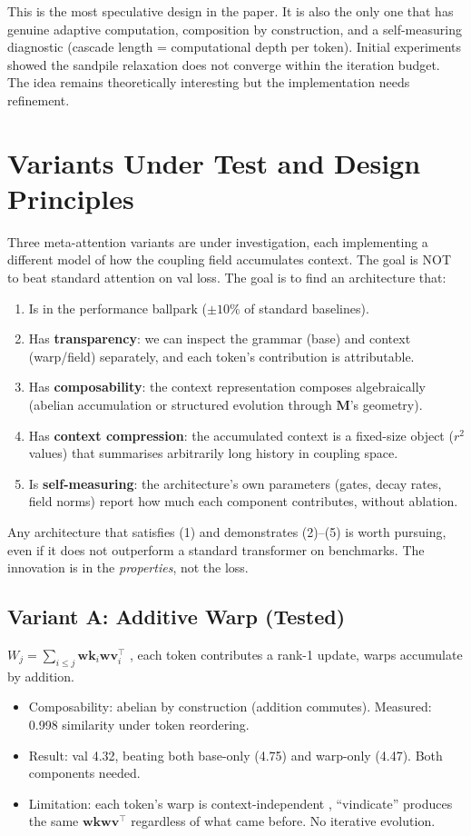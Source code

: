 \documentclass[11pt, a4paper]{article}
\newcommand{\M}{\mathbf{M}}
\theoremstyle{plain}
\theoremstyle{definition}
\theoremstyle{remark}
\begin{document}
This is the most speculative design in the paper.
It is also the only one that has genuine adaptive computation, composition by construction, and a self-measuring diagnostic (cascade length = computational depth per token).
Initial experiments showed the sandpile relaxation does not converge within the iteration budget.
The idea remains theoretically interesting but the implementation needs refinement.


\section{Variants Under Test and Design Principles}
\label{sec:variants}

Three meta-attention variants are under investigation, each implementing a different model of how the coupling field accumulates context.
The goal is NOT to beat standard attention on val loss.
The goal is to find an architecture that:
\begin{enumerate}[nosep]
\item Is in the performance ballpark ($\pm 10\%$ of standard baselines).
\item Has \textbf{transparency}: we can inspect the grammar (base) and context (warp/field) separately, and each token's contribution is attributable.
\item Has \textbf{composability}: the context representation composes algebraically (abelian accumulation or structured evolution through $\M$'s geometry).
\item Has \textbf{context compression}: the accumulated context is a fixed-size object ($r^2$ values) that summarises arbitrarily long history in coupling space.
\item Is \textbf{self-measuring}: the architecture's own parameters (gates, decay rates, field norms) report how much each component contributes, without ablation.
\end{enumerate}

Any architecture that satisfies (1) and demonstrates (2)--(5) is worth pursuing, even if it does not outperform a standard transformer on benchmarks.
The innovation is in the \emph{properties}, not the loss.

\subsection{Variant A: Additive Warp (Tested)}

$W_j = \sum_{i \leq j} \mathbf{wk}_i \mathbf{wv}_i^\top$ ,  each token contributes a rank-1 update, warps accumulate by addition.
\begin{itemize}[nosep]
\item Composability: abelian by construction (addition commutes). Measured: 0.998 similarity under token reordering.
\item Result: val 4.32, beating both base-only (4.75) and warp-only (4.47). Both components needed.
\item Limitation: each token's warp is context-independent ,  ``vindicate'' produces the same $\mathbf{wk}\mathbf{wv}^\top$ regardless of what came before. No iterative evolution.
\end{itemize}
\end{document}
